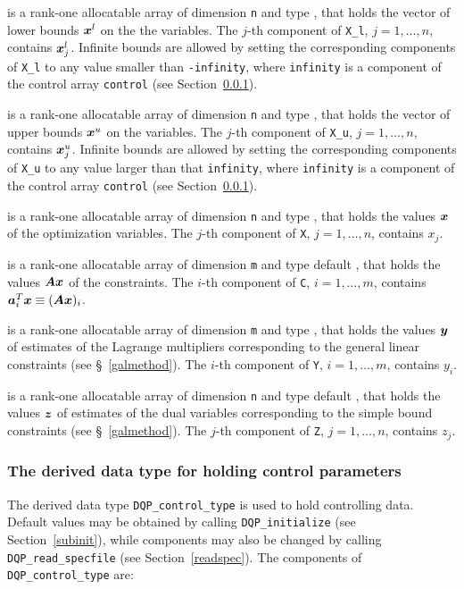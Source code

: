 \documentclass{galahad}
\newcommand{\packagename}{DQP}
\begin{document}
\begin{description}
 is a rank-one allocatable array of dimension {\tt n} and type
\realdp, that holds
the vector of lower bounds ${\bm{x}}^{l}$ on the the variables.
The $j$-th component of {\tt X\_l}, $j = 1, \ldots , n$,
contains ${\bm{x}}_{j}^{l}$.
Infinite bounds are allowed by setting the corresponding
components of {\tt X\_l} to any value smaller than {\tt -infinity},
where {\tt infinity} is a component of the control array {\tt control}
(see Section~\ref{typecontrol}).

 is a rank-one allocatable array of dimension {\tt n} and type
\realdp, that holds
the vector of upper bounds ${\bm{x}}^{u}$ on the variables.
The $j$-th component of {\tt X\_u}, $j = 1, \ldots , n$,
contains ${\bm{x}}_{j}^{u}$.
Infinite bounds are allowed by setting the corresponding
components of {\tt X\_u} to any value larger than that {\tt infinity},
where {\tt infinity} is a component of the control array {\tt control}
(see Section~\ref{typecontrol}).

 is a rank-one allocatable array of dimension {\tt n} and type
\realdp,
that holds the values ${\bm{x}}$ of the optimization variables.
The $j$-th component of {\tt X}, $j = 1,  \ldots , n$, contains $x_{j}$.

 is a rank-one allocatable array of dimension {\tt m} and type default
\realdp, that holds
the values ${\bm{A}} {\bm{x}}$ of the constraints.
The $i$-th component of {\tt C}, $i = 1,  \ldots ,  m$, contains
${\bm{a}}_{i}^{T}{\bm{x}} \equiv ({\bm{A}} {\bm{x}})_{i}$.

 is a rank-one allocatable array of dimension {\tt m} and type
\realdp, that holds
the values ${\bm{y}}$ of estimates  of the Lagrange multipliers
corresponding to the general linear constraints (see \S~\ref{galmethod}).
The $i$-th component of {\tt Y}, $i = 1,  \ldots ,  m$, contains $y_{i}$.

 is a rank-one allocatable array of dimension {\tt n} and type default
\realdp, that holds
the values ${\bm{z}}$ of estimates  of the dual variables
corresponding to the simple bound constraints (see \S~\ref{galmethod}).
The $j$-th component of {\tt Z}, $j = 1,  \ldots ,  n$, contains $z_{j}$.

\end{description}


\subsubsection{The derived data type for holding control
 parameters}\label{typecontrol}
The derived data type
{\tt \packagename\_control\_type}
is used to hold controlling data. Default values may be obtained by calling
{\tt \packagename\_initialize}
(see Section~\ref{subinit}),
while components may also be changed by calling
{\tt \packagename\_read\-\_specfile}
(see Section~\ref{readspec}).
The components of
{\tt \packagename\_control\_type}
are:
\end{document}
